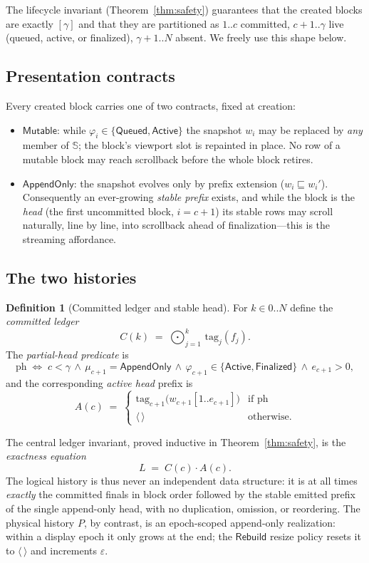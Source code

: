 \documentclass[11pt]{article}
\newcommand{\seq}[1]{\langle #1\rangle}
\newcommand{\emptyseq}{\seq{\,}}
\newcommand{\pre}{\sqsubseteq}                 %
\newcommand{\cat}{\mathbin{\cdot}}             %
\newcommand{\Cat}{\bigodot}                    %
\newcommand{\Snap}{\mathbb{S}}
\newcommand{\Mutable}{\mathsf{Mutable}}
\newcommand{\AppendOnly}{\mathsf{AppendOnly}}
\newcommand{\Queued}{\mathsf{Queued}}
\newcommand{\Active}{\mathsf{Active}}
\newcommand{\Finalized}{\mathsf{Finalized}}
\newcommand{\Rebuild}{\mathsf{Rebuild}}
\newcommand{\tg}{\mathrm{tag}}
\newcommand{\PH}{\mathrm{ph}}
\newcommand{\Ledger}{L}
\newcommand{\Native}{P}
\newcommand{\created}{\gamma}
\theoremstyle{definition}
\newtheorem{definition}[theorem]{Definition}
\theoremstyle{remark}
\begin{document}
The lifecycle invariant (Theorem~\ref{thm:safety}) guarantees that the created
blocks are exactly $[\created]$ and that they are partitioned as
$1..c$ committed, $c{+}1..\created$ live (queued, active, or finalized),
$\created{+}1..N$ absent. We freely use this shape below.

\subsection{Presentation contracts}

Every created block carries one of two contracts, fixed at creation:

\begin{itemize}
\item $\Mutable$: while $\varphi_i\in\{\Queued,\Active\}$ the snapshot $w_i$
  may be replaced by \emph{any} member of $\Snap$; the block's viewport slot
  is repainted in place. No row of a mutable block may reach scrollback before
  the whole block retires.
\item $\AppendOnly$: the snapshot evolves only by prefix extension
  ($w_i\pre w_i'$). Consequently an ever-growing \emph{stable prefix} exists,
  and while the block is the \emph{head} (the first uncommitted block,
  $i=c{+}1$) its stable rows may scroll naturally, line by line, into
  scrollback ahead of finalization---this is the streaming affordance.
\end{itemize}

\subsection{The two histories}\label{sec:histories}

\begin{definition}[Committed ledger and stable head]\label{def:ledger}
For $k\in 0..N$ define the \emph{committed ledger}
\[
  C(k) \;=\; \Cat_{j=1}^{k}\, \tg_j(f_j).
\]
The \emph{partial-head predicate} is
\[
  \PH \;\iff\;
  c<\created \,\wedge\, \mu_{c+1}=\AppendOnly \,\wedge\,
  \varphi_{c+1}\in\{\Active,\Finalized\} \,\wedge\, e_{c+1}>0,
\]
and the corresponding \emph{active head} prefix is
\[
  A(c) \;=\;
  \begin{cases}
    \tg_{c+1}\bigl(w_{c+1}[1..e_{c+1}]\bigr) & \text{if } \PH\\
    \emptyseq & \text{otherwise.}
  \end{cases}
\]
\end{definition}

The central ledger invariant, proved inductive in
Theorem~\ref{thm:safety}, is the \emph{exactness equation}
\begin{equation}\label{eq:ech}
  \Ledger \;=\; C(c)\cat A(c).
\end{equation}
The logical history is thus never an independent data structure: it is at all
times \emph{exactly} the committed finals in block order followed by the
stable emitted prefix of the single append-only head, with no duplication,
omission, or reordering. The physical history $\Native$, by contrast, is an
epoch-scoped append-only realization: within a display epoch it only grows at
the end; the $\Rebuild$ resize policy resets it to $\emptyseq$ and increments
$\varepsilon$.
\end{document}
